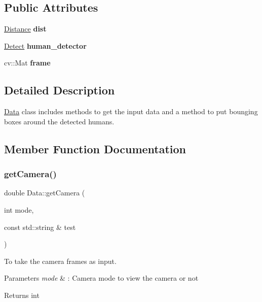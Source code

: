 \subsection*{Public Attributes}
\begin{DoxyCompactItemize}
\item 
\mbox{\label{classData_ae089cb20a02909129d8f055805d38f8e}} 
\hyperlink{classDistance}{Distance} {\bfseries dist}
\item 
\mbox{\label{classData_aa4b6fa81e2c1055e4a193bef4fd1b03c}} 
\hyperlink{classDetect}{Detect} {\bfseries human\+\_\+detector}
\item 
\mbox{\label{classData_aba335c8ce9ac25fe621238c4c5d9acdb}} 
cv\+::\+Mat {\bfseries frame}
\end{DoxyCompactItemize}


\subsection{Detailed Description}
\hyperlink{classData}{Data} class includes methods to get the input data and a method to put bounging boxes around the detected humans. 

\subsection{Member Function Documentation}
\mbox{\label{classData_ab632c5dd4acbd86dba0921210aa7139d}} 
\subsubsection{\texorpdfstring{get\+Camera()}{getCamera()}}
{\footnotesize\ttfamily double Data\+::get\+Camera (\begin{DoxyParamCaption}\item[{int}]{mode,  }\item[{const std\+::string \&}]{test }\end{DoxyParamCaption})}



To take the camera frames as input. 


\begin{DoxyParams}{Parameters}
{\em mode} & \+: Camera mode to view the camera or not \\
\hline
\end{DoxyParams}
\begin{DoxyReturn}{Returns}
int 
\end{DoxyReturn}
\mbox{\label{classData_a0a8569daf0e938c6793c3241fc1f9023}} 
